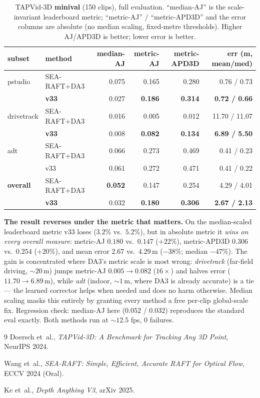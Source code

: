 \documentclass[11pt,a4paper]{article}
\begin{document}
\begin{table}[h]
\centering
\caption{TAPVid-3D \textbf{minival} (150 clips), full evaluation. ``median-AJ''
is the scale-invariant leaderboard metric; ``metric-AJ'' / ``metric-APD3D'' and
the error columns are absolute (no median scaling, fixed-metre thresholds).
Higher AJ/APD3D is better; lower error is better.}
\label{tab:metric3d}
\begin{tabular}{llrrrr}
\toprule
subset & method & median-AJ & metric-AJ & metric-APD3D & err (m, mean/med) \\
\midrule
pstudio    & SEA-RAFT+DA3 & 0.075 & 0.165 & 0.280 & 0.76 / 0.73 \\
           & \textbf{v33} & 0.027 & \textbf{0.186} & \textbf{0.314} & \textbf{0.72 / 0.66} \\
drivetrack & SEA-RAFT+DA3 & 0.016 & 0.005 & 0.012 & 11.70 / 11.07 \\
           & \textbf{v33} & 0.008 & \textbf{0.082} & \textbf{0.134} & \textbf{6.89 / 5.50} \\
adt        & SEA-RAFT+DA3 & 0.066 & 0.273 & 0.469 & 0.41 / 0.23 \\
           & v33          & 0.061 & 0.272 & 0.471 & 0.41 / 0.22 \\
\midrule
\textbf{overall} & SEA-RAFT+DA3 & \textbf{0.052} & 0.147 & 0.254 & 4.29 / 4.01 \\
                 & \textbf{v33} & 0.032 & \textbf{0.180} & \textbf{0.306} & \textbf{2.67 / 2.13} \\
\bottomrule
\end{tabular}
\end{table}

\noindent \textbf{The result reverses under the metric that matters.} On the
median-scaled leaderboard metric v33 loses ($3.2\%$ vs.\ $5.2\%$), but in
absolute metric it \emph{wins on every overall measure}: metric-AJ
$0.180$ vs.\ $0.147$ ($+22\%$), metric-APD3D $0.306$ vs.\ $0.254$ ($+20\%$), and
mean error $2.67$ vs.\ $4.29$\,m ($-38\%$; median $-47\%$). The gain is
concentrated where DA3's metric scale is most wrong: \emph{drivetrack}
(far-field driving, ${\sim}20$\,m) jumps metric-AJ $0.005\!\to\!0.082$
($16\times$) and halves error ($11.70\!\to\!6.89$\,m), while \emph{adt}
(indoor, ${\sim}1$\,m, where DA3 is already accurate) is a tie --- the learned
corrector helps when needed and does no harm otherwise. Median scaling masks
this entirely by granting every method a free per-clip global-scale fix.
Regression check: median-AJ here ($0.052$ / $0.032$) reproduces the standard
eval exactly. Both methods run at ${\sim}12.5$ fps, $0$ failures.

\begin{thebibliography}{9}
  Doersch et~al.,
  \textit{TAPVid-3D: A Benchmark for Tracking Any 3D Point},
  NeurIPS 2024.

  Wang et~al.,
  \textit{SEA-RAFT: Simple, Efficient, Accurate RAFT for Optical Flow},
  ECCV 2024 (Oral).

  Ke et~al.,
  \textit{Depth Anything V3},
  arXiv 2025.
\end{thebibliography}
\end{document}
